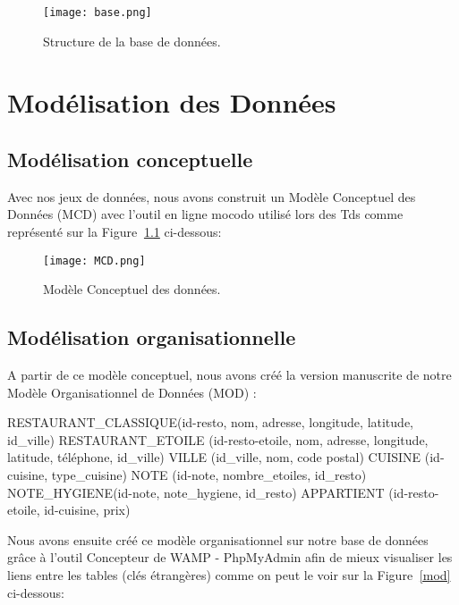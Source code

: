 \documentclass[mstat,12pt]{unswthesis}
\begin{document}
\begin{figure}
\hypertarget{base}{%
\centering
\texttt{[image: base.png]}
\caption{Structure de la base de données.}\label{base}
}
\end{figure}

\hypertarget{moduxe9lisation-des-donnuxe9es}{%
\chapter{Modélisation des
Données}\label{moduxe9lisation-des-donnuxe9es}}

\hypertarget{moduxe9lisation-conceptuelle}{%
\section{Modélisation conceptuelle}\label{moduxe9lisation-conceptuelle}}

Avec nos jeux de données, nous avons construit un Modèle Conceptuel des
Données (MCD) avec l'outil en ligne mocodo utilisé lors des Tds comme
représenté sur la Figure \(~\)\ref{mcd} ci-dessous:

\begin{figure}
\hypertarget{mcd}{%
\centering
\texttt{[image: MCD.png]}
\caption{Modèle Conceptuel des données.}\label{mcd}
}
\end{figure}

\bigskip

\hypertarget{moduxe9lisation-organisationnelle}{%
\section{Modélisation
organisationnelle}\label{moduxe9lisation-organisationnelle}}

A partir de ce modèle conceptuel, nous avons créé la version manuscrite
de notre Modèle Organisationnel de Données (MOD) :

RESTAURANT\_CLASSIQUE(id-resto, nom, adresse, longitude, latitude,
id\_ville) RESTAURANT\_ETOILE (id-resto-etoile, nom, adresse, longitude,
latitude, téléphone, id\_ville) VILLE (id\_ville, nom, code postal)
CUISINE (id-cuisine, type\_cuisine) NOTE (id-note, nombre\_etoiles,
id\_resto) NOTE\_HYGIENE(id-note, note\_hygiene, id\_resto) APPARTIENT
(id-resto-etoile, id-cuisine, prix)

\medskip

Nous avons ensuite créé ce modèle organisationnel sur notre base de
données grâce à l'outil Concepteur de WAMP - PhpMyAdmin afin de mieux
visualiser les liens entre les tables (clés étrangères) comme on peut le
voir sur la Figure \(~\)\ref{mod} ci-dessous:
\end{document}
